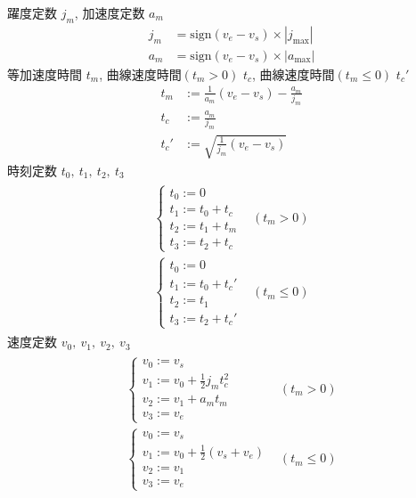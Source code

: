 \documentclass[a5paper]{ltjsarticle}
\begin{document}
躍度定数 $j_m$,
加速度定数 $a_m$
\begin{align}
    j_m & = \mathrm{sign}(v_e-v_s) \times|j_{\max}| \\
    a_m & = \mathrm{sign}(v_e-v_s) \times|a_{\max}|
\end{align}
等加速度時間 $t_m$,
曲線速度時間$(t_m>0)$ $t_c$,
曲線速度時間$(t_m\leq 0)$ $t_c'$
\begin{align}
    t_m  & := \frac{1}{a_m}(v_e - v_s) - \frac{a_m}{j_m} \\
    t_c  & := \frac{a_m}{j_m}                            \\
    t_c' & := \sqrt{\frac{1}{j_m}(v_e-v_s)}
\end{align}
時刻定数 $t_0,~t_1,~t_2,~t_3$
\begin{align}
    \begin{array}{ll}
        \left\{ \begin{array}{l}
            t_0 := 0         \\
            t_1 := t_0 + t_c \\
            t_2 := t_1 + t_m \\
            t_3 := t_2 + t_c
        \end{array} \right.
         &
        (t_m > 0)
        \\
        \left\{ \begin{array}{l}
            t_0 := 0          \\
            t_1 := t_0 + t_c' \\
            t_2 := t_1        \\
            t_3 := t_2 + t_c'
        \end{array} \right.
         &
        (t_m \leq 0)
    \end{array}
\end{align}
速度定数 $v_0,~v_1,~v_2,~v_3$
\begin{align}
    \begin{array}{ll}
        \left\{ \begin{array}{l}
            v_0 := v_s                        \\
            v_1 := v_0 + \frac{1}{2}j_m t_c^2 \\
            v_2 := v_1 + a_m t_m              \\
            v_3 := v_e
        \end{array} \right.
         &
        (t_m > 0)
        \\
        \left\{ \begin{array}{l}
            v_0 := v_s                                     \\
            v_1 := v_0 + \frac{1}{2}\left( v_s+v_e \right) \\
            v_2 := v_1                                     \\
            v_3 := v_e
        \end{array} \right.
         &
        (t_m \leq 0)
    \end{array}
\end{align}
\end{document}
